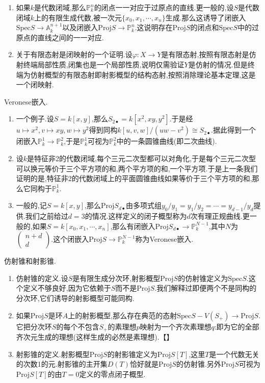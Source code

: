 \begin{enumerate}
	\item 如果$k$是代数闭域,那么$\mathbb{P}^n_k$的闭点一一对应于过原点的直线.更一般的,设$S$是代数闭域$k$上的有限生成代数,被一次元$\{x_0,x_1,\cdots,x_n\}$生成.那么这诱导了闭嵌入$\mathrm{Spec}S\to\mathbb{A}_k^{n+1}$以及闭嵌入$\mathrm{Proj}S\to\mathbb{P}_k^n$.这说明存在$\mathrm{Proj}S$的闭点和$\mathrm{Spec}S$中的过原点的直线之间的一一对应.
	\item 关于有限态射是闭映射的一个证明.设$\varphi:X\to Y$是有限态射,按照有限态射是仿射终端局部性质,闭集也是一个局部性质,说明仅需验证$Y$是仿射的情况.但是终端为仿射概型的有限态射即射影概型的结构态射,按照消除理论基本定理,这是一个闭映射.
\end{enumerate}

Veronese嵌入.
\begin{enumerate}
	\item 一个例子.设$S=k[x,y]$,那么$S_{2\bullet}=k[x^2,xy,y^2]$.于是经$u\mapsto x^2,v\mapsto xy,w\mapsto y^2$得到同构$k[u,v,w]/(uw-v^2)\cong S_{2\bullet}$.据此得到一个闭嵌入$\mathbb{P}_k^1\to\mathbb{P}_k^2$,于是$\mathbb{P}_k^1$可视为$\mathbb{P}_k^2$中的一条圆锥曲线(即二次曲线).
	\item 设$k$是特征非2的代数闭域,每个三元二次型都可以对角化,于是每个三元二次型可以换元等价于三个平方项的和,两个平方项的和,一个平方项.于是上一条我们证明的是,特征非2的代数闭域上的平面圆锥曲线如果等价于三个平方项的和,那么它同构于$\mathbb{P}_k^1$.
	\item 一般的,记$S=k[x,y]$,那么$\mathrm{Proj}S_{d\bullet}$由多项式组$y_0/y_1=y_1/y_2=\cdots=y_{d-1}/y_d$提供.我们之前给过$d=3$的情况.这样定义的闭子概型称为$d$次有理正规曲线.更一般的,如果$S=k[x_0,x_1,\cdots,x_n]$,那么有闭嵌入$\mathrm{Proj}S_{d\bullet}\to\mathbb{P}_k^{N-1}$,其中$N$为$\left(\begin{array}{c}n+d\\d\end{array}\right)$.这个闭嵌入$\mathrm{Proj}S\to\mathbb{P}_k^{N-1}$称为Veronese嵌入.
\end{enumerate}

仿射锥和射影锥.
\begin{enumerate}
	\item 仿射锥的定义.设$S$是有限生成分次环,射影概型$\mathrm{Proj}S$的仿射锥定义为$\mathrm{Spec}S$.这个定义不够良好,因为它依赖于$S$而不是$\mathrm{Proj}S$.我们解释过即便两个不是同构的分次环,它们诱导的射影概型可能同构.
	\item 如果$\mathrm{Proj}S$是环$A$上的射影概型,那么存在典范的态射$\mathrm{Spec}S-V(S_+)\to\mathrm{Proj}S$.它把分次环$S$的每个不包含$S_+$的素理想$p$映射为一个齐次素理想$q$:即为它的全部齐次元生成的理想(这样生成的必然是素理想).【】
	\item 射影锥的定义.射影概型$\mathrm{Proj}S$的射影锥定义为$\mathrm{Proj}S[T]$,这里$T$是一个代数无关的次数1的元.射影锥的主开集$D(T)$恰好就是$\mathrm{Proj}S$的仿射锥.另外$\mathrm{Proj}S$可视为$\mathrm{Proj}S[T]$的由$T=0$定义的零点闭子概型.
\end{enumerate}












